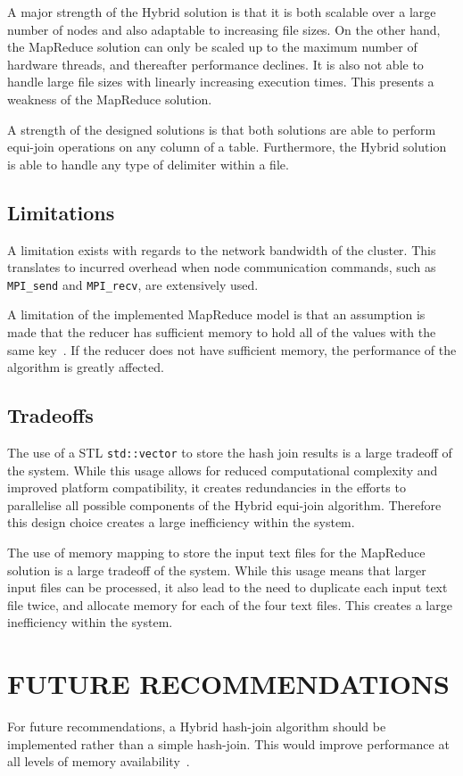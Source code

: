 \documentclass[12pt,twocolumn]{witseiepaper}
\begin{document}
A major strength of the Hybrid solution is that it is both scalable over a large number of nodes and also adaptable to increasing file sizes. On the other hand, the MapReduce solution can only be scaled up to the maximum number of hardware threads, and thereafter performance declines. It is also not able to handle large file sizes with linearly increasing execution times. This presents a weakness of the MapReduce solution.

A strength of the designed solutions is that both solutions are able to perform equi-join operations on any column of a table. Furthermore, the Hybrid solution is able to handle any type of delimiter within a file.

\subsection{Limitations}
A limitation exists with regards to the network bandwidth of the cluster. This translates to incurred overhead when node communication commands, such as \texttt{MPI\_send} and \texttt{MPI\_recv}, are extensively used.

A limitation of the implemented MapReduce model is that an assumption is made that the reducer has sufficient memory to hold all of the values with the same key~\cite{mapReduceJoin}. If the reducer does not have sufficient memory, the performance of the algorithm is greatly affected.

\subsection{Tradeoffs} \label{sec:tradeoffs}
The use of a STL \texttt{std::vector} to store the hash join results is a large tradeoff of the system. While this usage allows for reduced computational complexity and improved platform compatibility, it creates redundancies in the efforts to parallelise all possible components of the Hybrid equi-join algorithm. Therefore this design choice creates a large inefficiency within the system.

The use of memory mapping to store the input text files for the MapReduce solution is a large tradeoff of the system. While this usage means that larger input files can be processed, it also lead to the need to duplicate each input text file twice, and allocate memory for each of the four text files. This creates a large inefficiency within the system.

\section{FUTURE RECOMMENDATIONS}
For future recommendations, a Hybrid hash-join algorithm should be implemented rather than a simple hash-join. This would improve performance at all levels of memory availability~\cite{evaluating4JoinAlgorithms}.
\end{document}

